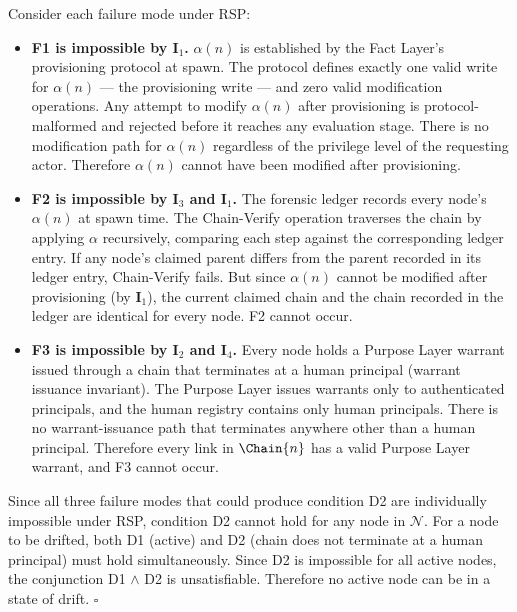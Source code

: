 Consider each failure mode under RSP:

\begin{itemize}
\item \textbf{F1 is impossible by $\textbf{I}_1$.} $\alpha(n)$ is established by the Fact Layer's provisioning protocol at spawn. The protocol defines exactly one valid write for $\alpha(n)$ — the provisioning write — and zero valid modification operations. Any attempt to modify $\alpha(n)$ after provisioning is protocol-malformed and rejected before it reaches any evaluation stage. There is no modification path for $\alpha(n)$ regardless of the privilege level of the requesting actor. Therefore $\alpha(n)$ cannot have been modified after provisioning.

\item \textbf{F2 is impossible by $\textbf{I}_3$ and $\textbf{I}_1$.} The forensic ledger records every node's $\alpha(n)$ at spawn time. The Chain-Verify operation traverses the chain by applying $\alpha$ recursively, comparing each step against the corresponding ledger entry. If any node's claimed parent differs from the parent recorded in its ledger entry, Chain-Verify fails. But since $\alpha(n)$ cannot be modified after provisioning (by $\textbf{I}_1$), the current claimed chain and the chain recorded in the ledger are identical for every node. F2 cannot occur.

\item \textbf{F3 is impossible by $\textbf{I}_2$ and $\textbf{I}_4$.} Every node holds a Purpose Layer warrant issued through a chain that terminates at a human principal (warrant issuance invariant). The Purpose Layer issues warrants only to authenticated principals, and the human registry contains only human principals. There is no warrant-issuance path that terminates anywhere other than a human principal. Therefore every link in $\Chain{n}$ has a valid Purpose Layer warrant, and F3 cannot occur.
\end{itemize}

Since all three failure modes that could produce condition D2 are individually impossible under RSP, condition D2 cannot hold for any node in $\mathcal{N}$. For a node to be drifted, both D1 (active) and D2 (chain does not terminate at a human principal) must hold simultaneously. Since D2 is impossible for all active nodes, the conjunction D1 $\land$ D2 is unsatisfiable. Therefore no active node can be in a state of drift. $\square$

